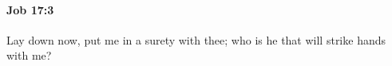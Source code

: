 
		\paragraph{Job 17:3} %
			\label{JOB-17-3}

			Lay down now, put me in a surety with thee; who is he that will strike hands with me?


